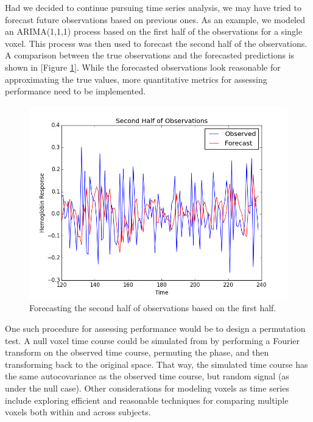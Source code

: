 \documentclass[11pt]{article}
\begin{document}
\par Had we decided to continue pursuing time series analysis, we may have 
tried to forecast future observations based on previous ones. As an example, 
we modeled an ARIMA(1,1,1) process based on the first half of the 
observations for a single voxel. This process was then used to forecast the 
second half of the observations. A comparison between the true observations 
and the forecasted predictions is shown in [Figure \ref{fig:ts-preds}]. 
While the forecasted observations look reasonable for approximating the true 
values, more quantitative metrics for assessing performance need to be 
implemented. 

\begin{figure}[ht]
\centering
\includegraphics[scale=0.5]{images/ts-preds.png}
\caption{Forecasting the second half of observations based on the first 
half.}
\label{fig:ts-preds}
\end{figure}

\par One such procedure for assessing performance would be to design a 
permutation test. A null voxel time course could be simulated from by 
performing a Fourier transform on the observed time course, permuting the 
phase, and then transforming back to the original space. That way, the 
simulated time course has the same autocovariance as the observed time 
course, but random signal (as under the null case). Other considerations 
for modeling voxels as time series include exploring efficient and 
reasonable techniques for comparing multiple voxels both within and across 
subjects. 


\end{document}
